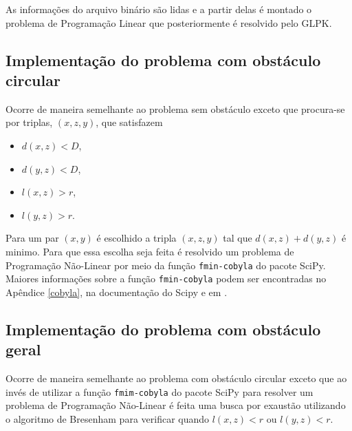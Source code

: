As informações do arquivo binário são lidas e a partir delas é montado o
problema de Programação Linear que posteriormente é resolvido pelo GLPK.

\subsection{Implementação do problema com obstáculo circular}
Ocorre de maneira semelhante ao problema sem obstáculo exceto que procura-se
por triplas, $(x, z, y)$, que satisfazem 
\begin{itemize}
    \item $d(x, z) < D$,
    \item $d(y, z) < D$,
    \item $l(x, z) > r$,
    \item $l(y, z) > r$.
\end{itemize}

Para um par $(x, y)$ é escolhido a tripla $(x, z, y)$ tal que $d(x, z) + d(y,
z)$ é minimo. Para que essa escolha seja feita é resolvido um problema de
Programação Não-Linear por meio da função \texttt{fmin-cobyla} do pacote SciPy.
Maiores
informações sobre a função \texttt{fmin-cobyla} podem ser encontradas no
Apêndice \ref{cobyla}, na documentação do Scipy e em \cite{Powell:2007}.

\subsection{Implementação do problema com obstáculo geral}
Ocorre de maneira semelhante ao problema com obstáculo circular exceto que ao
invés de utilizar a função \texttt{fmim-cobyla} do pacote SciPy para resolver
um problema de Programação Não-Linear é feita uma busca por exaustão utilizando
o algoritmo de Bresenham para verificar quando $l(x, z) < r$ ou $l(y, z) < r$.

